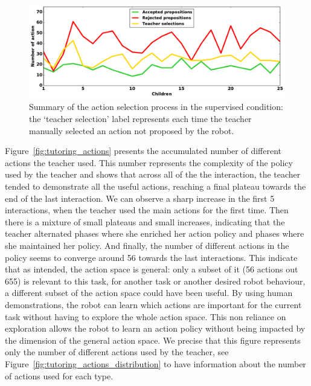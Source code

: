 \begin{figure}[ht]
	\includegraphics[width=1\linewidth]{./summary_supervision.pdf}
	\centering
	\caption{Summary of the action selection process in the supervised condition: the `teacher selection' label represents each time the teacher manually selected an action not proposed by the robot.}
	\label{fig:tutoring_supervision}
\end{figure}


Figure~\ref{fig:tutoring_actions} presents the accumulated number of different actions the teacher used. This number represents the complexity of the policy used by the teacher and shows that across all of the the interaction, the teacher tended to demonstrate all the useful actions, reaching a final plateau towards the end of the last interaction. We can observe a sharp increase in the first 5 interactions, when the teacher used the main actions for the first time. Then there is a mixture of small plateaus and small increases, indicating that the teacher alternated phases where she enriched her action policy and phases where she maintained her policy. And finally, the number of different actions in the policy seems to converge around 56 towards the last interactions. This indicate that as intended, the action space is general: only a subset of it (56 actions out 655) is relevant to this task, for another task or another desired robot behaviour, a different subset of the action space could have been useful. By using human demonstrations, the robot can learn which actions are important for the current task without having to explore the whole action space. This non reliance on exploration allows the robot to learn an action policy without being impacted by the dimension of the general action space. We precise that this figure represents only the number of different actions used by the teacher, see Figure~\ref{fig:tutoring_actions_distribution} to have information about the number of actions used for each type.

